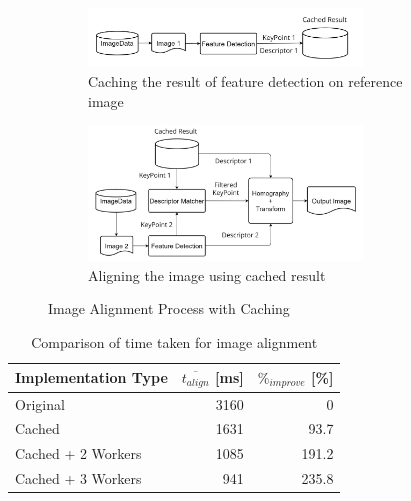 \begin{figure}[ht!]
    \centering
    \begin{subfigure}[c]{0.8\textwidth}
        \begin{minipage}{\textwidth}
            \centering
            \includegraphics[width=0.8\textwidth]{texs/Part2/chapter4/image/fea1.jpg}
        \end{minipage}
        \caption{Caching the result of feature detection on reference image}
        \label{fig:improve_cache}
    \end{subfigure}
    \begin{subfigure}[c]{0.8\textwidth}
        \begin{minipage}{\textwidth}
            \centering
            \includegraphics[width=0.8\textwidth]{texs/Part2/chapter4/image/fea2.jpg}
        \end{minipage}
        \caption{Aligning the image using cached result}
        \label{fig:improve_align}
    \end{subfigure}
    \caption{Image Alignment Process with Caching}
    \label{fig:image_alignment_process_with_caching}
\end{figure}

\begin{table}[!ht]
    \centering
    \begin{tabular}{|l|r|r|}
        \hline
        \textbf{Implementation Type} & \textbf{$\overline{t_{align}}$ [ms]} & \textbf{$\%_{improve}$ [\%]} \\ \hline
        Original                     & 3160                                 & 0                            \\ \hline
        Cached                       & 1631                                 & 93.7                         \\ \hline
        Cached + 2 Workers           & 1085                                 & 191.2                        \\ \hline
        Cached + 3 Workers           & 941                                  & 235.8                        \\ \hline
    \end{tabular}
    \caption{Comparison of time taken for image alignment}
    \label{table:time_taken_improvement}
\end{table}

